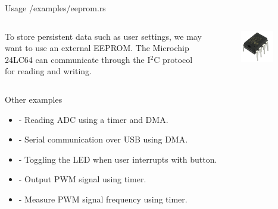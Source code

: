 \documentclass[
  aspectratio=169,
]{beamer}
\begin{document}
\begin{frame}{Usage /examples/eeprom.rs}
\begin{columns}[T] %
\hfill%
\begin{column}{.53\textwidth}
\vspace{10mm}
To store persistent data such as user settings, we may want to use an external EEPROM. The Microchip 24LC64 can communicate through the I$^2$C protocol for reading and writing.
\end{column}%
\hfill%
\begin{column}{.47\textwidth}
\vspace{-10mm}
\begin{figure}
\includegraphics[width=0.8\textwidth,height=0.8\textheight,keepaspectratio]{24lc64.jpg}
\end{figure}
\end{column}%
\end{columns}
\end{frame}



\begin{frame}{Other examples}
\begin{itemize}
\item {} - Reading ADC using a timer and DMA.
\item {} - Serial communication over USB using DMA.
\item {} - Toggling the LED when user interrupts with button.
\item {} - Output PWM signal using timer.
\item {} - Measure PWM signal frequency using timer.
\end{itemize}
\end{frame}
\end{document}

